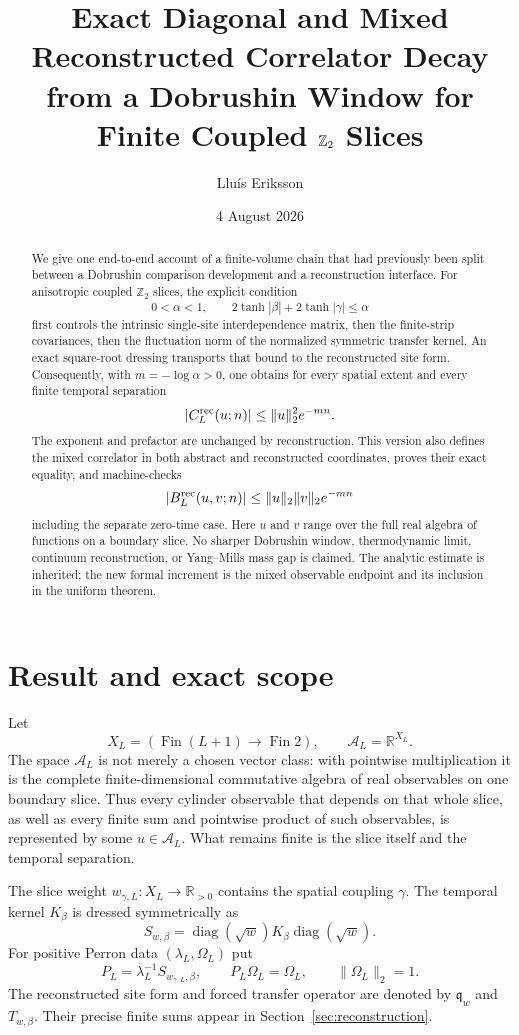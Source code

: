 \documentclass[11pt]{article}
\title{Exact Diagonal and Mixed Reconstructed Correlator Decay\\
from a Dobrushin Window for Finite Coupled $\Z_2$ Slices}
\author{Llu\'is Eriksson}
\date{4 August 2026}
\theoremstyle{definition}
\theoremstyle{remark}
\newcommand{\R}{\mathbb{R}}
\newcommand{\Z}{\mathbb{Z}}
\newcommand{\cA}{\mathcal{A}}
\newcommand{\diag}{\operatorname{diag}}
\begin{document}
\maketitle

\begin{abstract}
We give one end-to-end account of a finite-volume chain that had previously
been split between a Dobrushin comparison development and a reconstruction
interface.  For anisotropic coupled $\Z_2$ slices, the explicit condition
\[
  0<\alpha<1,
  \qquad 2\tanh|\beta|+2\tanh|\gamma|\leq\alpha
\]
first controls the intrinsic single-site interdependence matrix, then the
finite-strip covariances, then the fluctuation norm of the normalized symmetric
transfer kernel.  An exact square-root dressing transports that bound to the
reconstructed site form.  Consequently, with $m=-\log\alpha>0$, one obtains
for every spatial extent and every finite temporal separation
\[
  |C^{\rm rec}_L(u;n)|\leq \|u\|_2^2 e^{-mn}.
\]
The exponent and prefactor are unchanged by reconstruction.  This version
also defines the mixed correlator in both abstract and reconstructed
coordinates, proves their exact equality, and machine-checks
\[
  |B^{\rm rec}_L(u,v;n)|\leq \|u\|_2\|v\|_2 e^{-mn}
\]
including the separate zero-time case.  Here $u$ and $v$ range over the full
real algebra of functions on a boundary slice.  No sharper Dobrushin
window, thermodynamic limit, continuum reconstruction, or Yang--Mills mass gap
is claimed.  The analytic estimate is inherited; the new formal increment is
the mixed observable endpoint and its inclusion in the uniform theorem.
\end{abstract}

\section{Result and exact scope}

Let
\[
  X_L=(\operatorname{Fin}(L+1)\to\operatorname{Fin}2),
  \qquad \cA_L=\R^{X_L}.
\]
The space $\cA_L$ is not merely a chosen vector class: with pointwise
multiplication it is the complete finite-dimensional commutative algebra of
real observables on one boundary slice.  Thus every cylinder observable that
depends on that whole slice, as well as every finite sum and pointwise product
of such observables, is represented by some $u\in\cA_L$.  What remains finite
is the slice itself and the temporal separation.

The slice weight $w_{\gamma,L}:X_L\to\R_{>0}$ contains the spatial coupling
$\gamma$.  The temporal kernel $K_\beta$ is dressed symmetrically as
\[
  S_{w,\beta}=\diag(\sqrt w)K_\beta\diag(\sqrt w).
\]
For positive Perron data $(\lambda_L,\Omega_L)$ put
\[
  P_L=\lambda_L^{-1}S_{w_{\gamma,L},\beta},
  \qquad P_L\Omega_L=\Omega_L,
  \qquad \|\Omega_L\|_2=1.
\]
The reconstructed site form and forced transfer operator are denoted by
$\mathfrak q_w$ and $T_{w,\beta}$.  Their precise finite sums appear in
Section~\ref{sec:reconstruction}.
\end{document}
